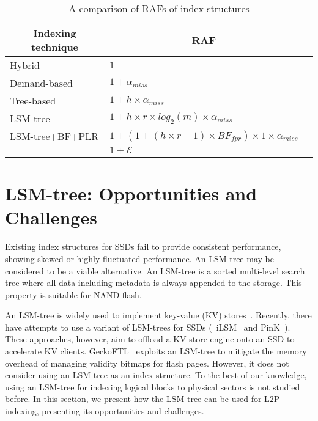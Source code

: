 \setlength{\tabcolsep}{0.7em}
{\renewcommand{\arraystretch}{0.6}
\begin{table}[t]
\footnotesize
\centering
\caption{A comparison of RAFs of index structures}
\begin{tabular}{|l||l|l|}
\hline
\multicolumn{1}{|c||}{\textbf{Indexing technique}}    & \multicolumn{1}{c|}{\textbf{RAF}}\\ \hline \hline
Hybrid                 & $1$                    \\ \hline
Demand-based           & $1+\alpha_{miss}$    \\ \hline
Tree-based             & $1+h\times \alpha_{miss}$\\ \hline
LSM-tree               & $1+h\times r \times log_{2}(m)\times \alpha_{miss} $\\ \hline
LSM-tree+BF+PLR & {$1 +(1+(h \times r-1)\times BF_{fpr}) \times 1 \times \alpha_{miss}$} \\ \hline
\ours{}                & $1+\mathcal{E}$\\ \hline
\end{tabular}
\label{tab:raf-cost}
\vspace{5pt}
\end{table}
}


\section{LSM-tree: Opportunities and Challenges}

Existing index structures for SSDs fail to provide consistent performance,
showing skewed or highly fluctuated performance.
An LSM-tree may be considered to be a viable alternative.
An LSM-tree is a sorted multi-level search tree
where all data including metadata is always appended to the storage.  This
property is suitable for NAND flash.  

An LSM-tree is widely used to implement key-value (KV) 
stores~\cite{leveldb, rocksdb}.
Recently, there have attempts to use a variant of LSM-trees for SSDs
(\eg~iLSM~\cite{ilsm} and PinK~\cite{pink}).  
These approaches, however, aim to
offload a KV store engine onto an SSD to accelerate KV clients.  
GeckoFTL~\cite{geckoFTL} exploits an LSM-tree to mitigate 
the memory overhead of managing validity bitmaps for flash pages. 
However, it does not consider using an LSM-tree as an index structure.
To the best of
our knowledge, using an LSM-tree for indexing logical blocks to physical
sectors is not studied before.  In this section, we present how the LSM-tree
can be used for L2P indexing, presenting its opportunities and
challenges.

